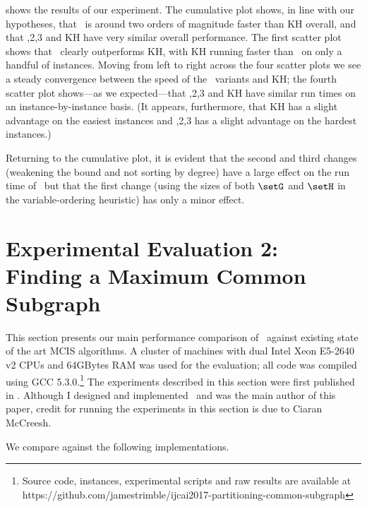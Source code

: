  shows the results of our experiment.  The cumulative plot shows,
in line with our hypotheses,
that \McSplit\ is around two orders of magnitude faster than KH overall, and that
,2,3 and KH have very similar overall performance.  The first scatter
plot shows that \McSplit\ clearly outperforms KH, with KH running faster than \McSplit\
on only a handful of instances.
  
Moving from left to right across the four
scatter plots we see a steady convergence between the speed of the \McSplit\ variants
and KH; the fourth scatter plot shows---as we expected---that
,2,3 and KH have similar run times on an instance-by-instance basis.
(It appears, furthermore, that
KH has a slight advantage on the easiest instances and
,2,3 has a slight advantage on the hardest instances.)

Returning to the cumulative plot, it is evident that the second and third changes (weakening
the bound and not sorting by degree) have a large effect on the run time of \McSplit\,
but that the first change (using the sizes of both $\setG$ and $\setH$ in the variable-ordering
heuristic) has only a minor effect.

\FloatBarrier

\section{Experimental Evaluation 2: Finding a Maximum Common Subgraph}
\label{sec:mcsplit-experiments}

This section presents our main performance comparison of \McSplit\ against
existing state of the art MCIS algorithms.
A cluster of machines with dual Intel Xeon E5-2640 v2 CPUs and
64GBytes RAM was used for the evaluation; all code was compiled
using GCC 5.3.0.\footnote{Source code, instances, experimental scripts and raw
results are available at
https://github.com/jamestrimble/ijcai2017-partitioning-common-subgraph}
The experiments described in this section were first published in
\citet{DBLP:conf/ijcai/McCreeshPT17}.  Although I designed and implemented
\McSplit\ and was the main author of this paper, credit for running
the experiments in this section is due to Ciaran McCreesh.

We compare against the following implementations.

